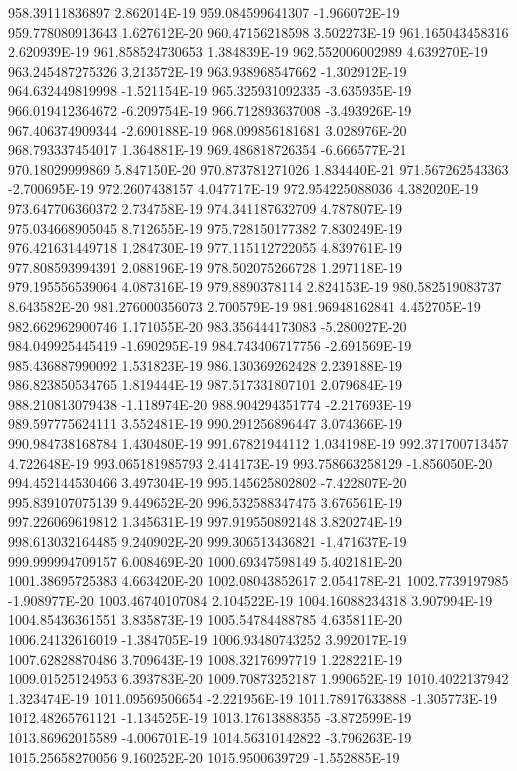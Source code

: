 958.39111836897  2.862014E-19
959.084599641307  -1.966072E-19
959.778080913643  1.627612E-20
960.47156218598  3.502273E-19
961.165043458316  2.620939E-19
961.858524730653  1.384839E-19
962.552006002989  4.639270E-19
963.245487275326  3.213572E-19
963.938968547662  -1.302912E-19
964.632449819998  -1.521154E-19
965.325931092335  -3.635935E-19
966.019412364672  -6.209754E-19
966.712893637008  -3.493926E-19
967.406374909344  -2.690188E-19
968.099856181681  3.028976E-20
968.793337454017  1.364881E-19
969.486818726354  -6.666577E-21
970.18029999869  5.847150E-20
970.873781271026  1.834440E-21
971.567262543363  -2.700695E-19
972.2607438157  4.047717E-19
972.954225088036  4.382020E-19
973.647706360372  2.734758E-19
974.341187632709  4.787807E-19
975.034668905045  8.712655E-19
975.728150177382  7.830249E-19
976.421631449718  1.284730E-19
977.115112722055  4.839761E-19
977.808593994391  2.088196E-19
978.502075266728  1.297118E-19
979.195556539064  4.087316E-19
979.8890378114  2.824153E-19
980.582519083737  8.643582E-20
981.276000356073  2.700579E-19
981.96948162841  4.452705E-19
982.662962900746  1.171055E-20
983.356444173083  -5.280027E-20
984.049925445419  -1.690295E-19
984.743406717756  -2.691569E-19
985.436887990092  1.531823E-19
986.130369262428  2.239188E-19
986.823850534765  1.819444E-19
987.517331807101  2.079684E-19
988.210813079438  -1.118974E-20
988.904294351774  -2.217693E-19
989.597775624111  3.552481E-19
990.291256896447  3.074366E-19
990.984738168784  1.430480E-19
991.67821944112  1.034198E-19
992.371700713457  4.722648E-19
993.065181985793  2.414173E-19
993.758663258129  -1.856050E-20
994.452144530466  3.497304E-19
995.145625802802  -7.422807E-20
995.839107075139  9.449652E-20
996.532588347475  3.676561E-19
997.226069619812  1.345631E-19
997.919550892148  3.820274E-19
998.613032164485  9.240902E-20
999.306513436821  -1.471637E-19
999.999994709157  6.008469E-20
1000.69347598149  5.402181E-20
1001.38695725383  4.663420E-20
1002.08043852617  2.054178E-21
1002.7739197985  -1.908977E-20
1003.46740107084  2.104522E-19
1004.16088234318  3.907994E-19
1004.85436361551  3.835873E-19
1005.54784488785  4.635811E-20
1006.24132616019  -1.384705E-19
1006.93480743252  3.992017E-19
1007.62828870486  3.709643E-19
1008.32176997719  1.228221E-19
1009.01525124953  6.393783E-20
1009.70873252187  1.990652E-19
1010.4022137942  1.323474E-19
1011.09569506654  -2.221956E-19
1011.78917633888  -1.305773E-19
1012.48265761121  -1.134525E-19
1013.17613888355  -3.872599E-19
1013.86962015589  -4.006701E-19
1014.56310142822  -3.796263E-19
1015.25658270056  9.160252E-20
1015.9500639729  -1.552885E-19
